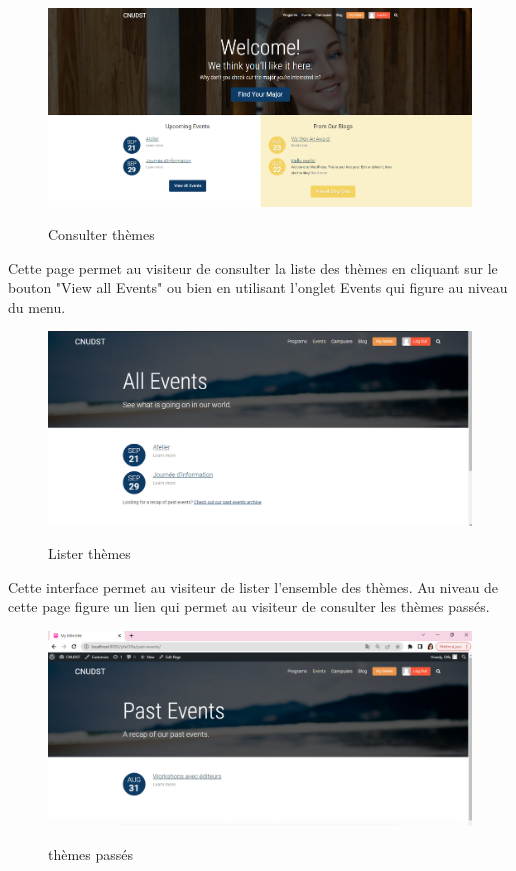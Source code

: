 \begin{figure}[!h]
	\centering
	{\includegraphics[width=1\textwidth]{D) IMAGES/ListerChamp.png}}
	\caption{Consulter thèmes}
	\label{Diagramme3}
\end{figure}
Cette page permet au visiteur de consulter la liste des thèmes en cliquant sur le bouton "View all Events" ou bien en utilisant l'onglet Events qui figure au niveau du menu.\\
\begin{figure}[!h]
	\centering
	{\includegraphics[width=1\textwidth]{D) IMAGES/BDlISTER.png}}
	\caption{Lister thèmes}
	\label{Diagramme3}
\end{figure}
\newpage
Cette interface permet au visiteur de lister l'ensemble des thèmes. Au niveau de cette page figure un lien qui permet au visiteur de consulter les thèmes passés.
\begin{figure}[!h]
	\centering
	{\includegraphics[width=1\textwidth]{D) IMAGES/Supprimer.png}}
	\caption{thèmes passés}
	\label{Diagramme3}
\end{figure}
